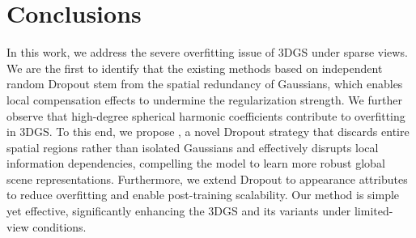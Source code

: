 \section{Conclusions}
In this work, we address the severe overfitting issue of 3DGS under sparse views.
We are the first to identify that the existing methods based on independent random Dropout stem from the spatial redundancy of Gaussians, which enables local compensation effects to undermine the regularization strength. We further observe that high-degree spherical harmonic coefficients contribute to overfitting in 3DGS.
To this end, we propose \methodname{}, a novel Dropout strategy that discards entire spatial regions rather than isolated Gaussians and effectively disrupts local information dependencies, compelling the model to learn more robust global scene representations. 
Furthermore, we extend Dropout to appearance attributes to reduce overfitting and enable post-training scalability. Our method is simple yet effective, significantly enhancing the 3DGS and its variants under limited-view conditions.